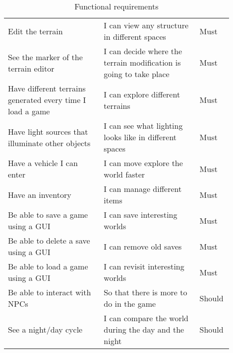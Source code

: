 \begin{table}[h]
\begin{tabular}{|p{0.4\linewidth}|p{0.4\linewidth}|p{0.1\linewidth}|}
        Edit the terrain                                           & I can view any structure in different spaces                       & Must           \\
        See the marker of the terrain editor                       & I can decide where the terrain modification is going to take place & Must           \\
        Have different terrains generated every time I load a game & I can explore different terrains                                   & Must           \\
        Have light sources that illuminate other objects           & I can see what lighting looks like in different spaces             & Must           \\
        Have a vehicle I can enter                                 & I can move explore the world faster                                & Must           \\
        Have an inventory                                          & I can manage different items                                       & Must           \\
        Be able to save a game using a GUI                         & I can save interesting worlds                                      & Must           \\
        Be able to delete a save using a GUI                       & I can remove old saves                                             & Must           \\
        Be able to load a game using a GUI                         & I can revisit interesting worlds                                   & Must           \\
        Be able to interact with NPCs                              & So that there is more to do in the game                            & Should         \\
        See a night/day cycle                                      & I can compare the world during the day and the night               & Should         \\
        \hline
    \end{tabular}
    \caption{Functional requirements}
    \label{tab:functional_requirements}
\end{table}